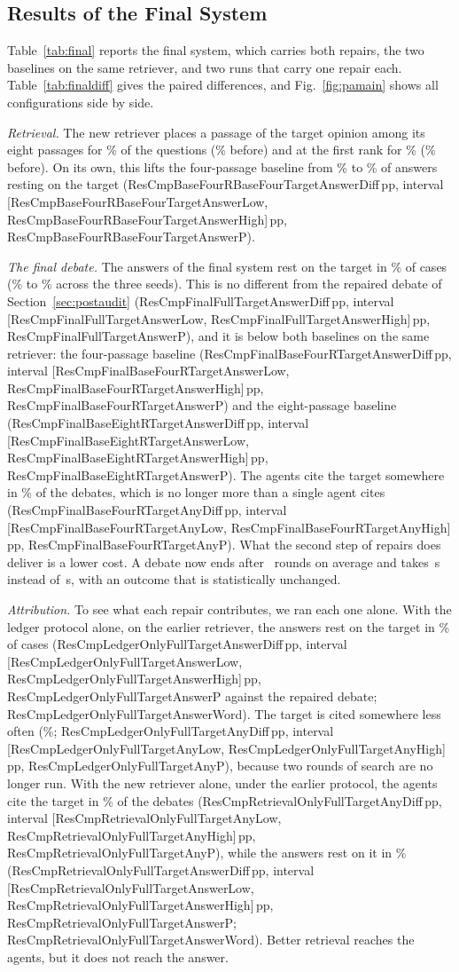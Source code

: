 \documentclass[conference]{IEEEtran}
\newcommand{\pp}{\,pp}
\newcommand{\cmp}[3]{\csname ResCmp#1#2Diff\endcsname#3, interval [\csname ResCmp#1#2Low\endcsname, \csname ResCmp#1#2High\endcsname]#3, \csname ResCmp#1#2P\endcsname}
\newcommand{\cmpword}[2]{\csname ResCmp#1#2Word\endcsname}
\begin{document}
\subsection{Results of the Final System}
Table~\ref{tab:final} reports the final system, which carries both repairs, the two baselines on the same retriever, and two runs that carry one repair each. Table~\ref{tab:finaldiff} gives the paired differences, and Fig.~\ref{fig:pamain} shows all configurations side by side.

\emph{Retrieval.} The new retriever places a passage of the target opinion among its eight passages for \ResStdFinalHitEight\% of the questions (\ResStdFullHitEight\% before) and at the first rank for \ResStdFinalHitOne\% (\ResStdFullHitOne\% before). On its own, this lifts the four-passage baseline from \ResPaBaseFourTargetAnswer\% to \ResPaBaseFourRTargetAnswer\% of answers resting on the target (\cmp{BaseFourRBaseFour}{TargetAnswer}{\pp}).

\emph{The final debate.} The answers of the final system rest on the target in \ResPaFinalTargetAnswer\% of cases (\ResPaFinalTargetAnswerMin\% to \ResPaFinalTargetAnswerMax\% across the three seeds). This is no different from the repaired debate of Section~\ref{sec:postaudit} (\cmp{FinalFull}{TargetAnswer}{\pp}), and it is below both baselines on the same retriever: the four-passage baseline (\cmp{FinalBaseFourR}{TargetAnswer}{\pp}) and the eight-passage baseline (\cmp{FinalBaseEightR}{TargetAnswer}{\pp}). The agents cite the target somewhere in \ResPaFinalTargetAny\% of the debates, which is no longer more than a single agent cites (\cmp{FinalBaseFourR}{TargetAny}{\pp}). What the second step of repairs does deliver is a lower cost. A debate now ends after \ResPaFinalRounds\ rounds on average and takes \ResPaFinalSecondsPerCase\,s instead of \ResPaFullSecondsPerCase\,s, with an outcome that is statistically unchanged.

\emph{Attribution.} To see what each repair contributes, we ran each one alone. With the ledger protocol alone, on the earlier retriever, the answers rest on the target in \ResPaLedgerOnlyTargetAnswer\% of cases (\cmp{LedgerOnlyFull}{TargetAnswer}{\pp} against the repaired debate; \cmpword{LedgerOnlyFull}{TargetAnswer}). The target is cited somewhere less often (\ResPaLedgerOnlyTargetAny\%; \cmp{LedgerOnlyFull}{TargetAny}{\pp}), because two rounds of search are no longer run. With the new retriever alone, under the earlier protocol, the agents cite the target in \ResPaRetrievalOnlyTargetAny\% of the debates (\cmp{RetrievalOnlyFull}{TargetAny}{\pp}), while the answers rest on it in \ResPaRetrievalOnlyTargetAnswer\% (\cmp{RetrievalOnlyFull}{TargetAnswer}{\pp}; \cmpword{RetrievalOnlyFull}{TargetAnswer}). Better retrieval reaches the agents, but it does not reach the answer.
\end{document}
